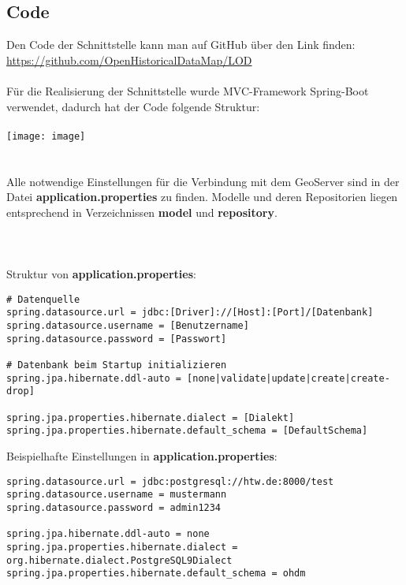 \subsection{Code}
Den Code der Schnittstelle kann man auf GitHub über den Link finden: \\
\url{https://github.com/OpenHistoricalDataMap/LOD} \\
\\
Für die Realisierung der Schnittstelle wurde MVC-Framework Spring-Boot 
verwendet, dadurch hat der Code folgende Struktur: \\
\\
\texttt{[image: image]} \\
\\
\\
Alle notwendige Einstellungen für die Verbindung mit dem GeoServer sind 
in der Datei \textbf{application.properties} zu finden.
Modelle und deren Repositorien liegen entsprechend in Verzeichnissen 
\textbf{model} und \textbf{repository}. \\
\\
\\
\\
Struktur von \textbf{application.properties}:

\lstset{frame=single,basicstyle=\ttfamily\footnotesize,breaklines=true}

\begin{lstlisting}
# Datenquelle
spring.datasource.url = jdbc:[Driver]://[Host]:[Port]/[Datenbank]
spring.datasource.username = [Benutzername]
spring.datasource.password = [Passwort]

# Datenbank beim Startup initializieren
spring.jpa.hibernate.ddl-auto = [none|validate|update|create|create-drop]

spring.jpa.properties.hibernate.dialect = [Dialekt]
spring.jpa.properties.hibernate.default_schema = [DefaultSchema]
\end{lstlisting}
\vspace{5mm}
\noindent
Beispielhafte Einstellungen in \textbf{application.properties}:

\begin{lstlisting}
spring.datasource.url = jdbc:postgresql://htw.de:8000/test
spring.datasource.username = mustermann
spring.datasource.password = admin1234

spring.jpa.hibernate.ddl-auto = none
spring.jpa.properties.hibernate.dialect = org.hibernate.dialect.PostgreSQL9Dialect
spring.jpa.properties.hibernate.default_schema = ohdm
\end{lstlisting}

